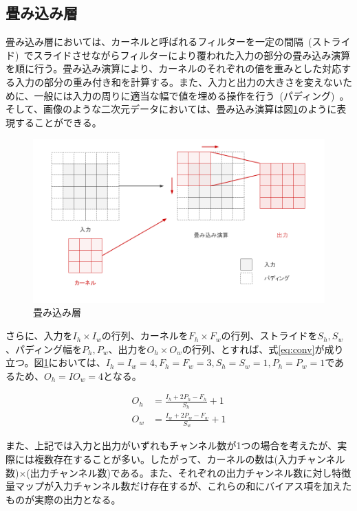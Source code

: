 \clearpage

\subsection{畳み込み層}

畳み込み層においては、カーネルと呼ばれるフィルターを一定の間隔~(ストライド)~でスライドさせながらフィルターにより覆われた入力の部分の畳み込み演算を順に行う。畳み込み演算により、カーネルのそれぞれの値を重みとした対応する入力の部分の重み付き和を計算する。また、入力と出力の大きさを変えないために、一般には入力の周りに適当な幅で値を埋める操作を行う~(パディング)~。そして、画像のような二次元データにおいては、畳み込み演算は図\ref{fig:conv}のように表現することができる。

\begin{figure}[b]
\begin{center}
\includegraphics[width=\hsize]{figure/convolution.png}
\caption{畳み込み層}
\label{fig:conv}
\end{center}
\end{figure}

さらに、入力を$I_h \times I_w$の行列、カーネルを$F_h \times F_w$の行列、ストライドを$S_h,S_w$、パディング幅を$P_h,P_w$、出力を$O_h \times O_w$の行列、とすれば、式\ref{eq:conv}が成り立つ。図\ref{fig:conv}においては、$I_h=I_w=4,F_h=F_w=3,S_h=S_w=1,P_h=P_w=1$であるため、$O_h=IO_w=4$となる。

\begin{align}
    \label{eq:conv}
    O_{h}&=\frac{I_h+2 P_h-F_{h}}{S_h}+1 \\
    O_{w}&=\frac{I_w+2 P_w-F_{w}}{S_w}+1
\end{align}

また、上記では入力と出力がいずれもチャンネル数が1つの場合を考えたが、実際には複数存在することが多い。したがって、カーネルの数は(入力チャンネル数)$\times$(出力チャンネル数)である。また、それぞれの出力チャンネル数に対し特徴量マップが入力チャンネル数だけ存在するが、これらの和にバイアス項を加えたものが実際の出力となる。

